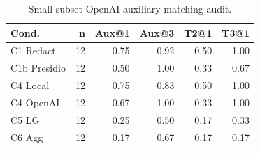 \begin{table}[t]
\centering
\small
\setlength{\tabcolsep}{3pt}
\caption{Small-subset OpenAI auxiliary matching audit.}
\label{tab:openai_aux_audit}
\begin{tabular}{lrrrrr}
\toprule
Cond. & n & Aux@1 & Aux@3 & T2@1 & T3@1 \\
\midrule
C1 Redact & 12 & 0.75 & 0.92 & 0.50 & 1.00 \\
C1b Presidio & 12 & 0.50 & 1.00 & 0.33 & 0.67 \\
C4 Local & 12 & 0.75 & 0.83 & 0.50 & 1.00 \\
C4 OpenAI & 12 & 0.67 & 1.00 & 0.33 & 1.00 \\
C5 LG & 12 & 0.25 & 0.50 & 0.17 & 0.33 \\
C6 Agg & 12 & 0.17 & 0.67 & 0.17 & 0.17 \\
\bottomrule
\end{tabular}
\end{table}
